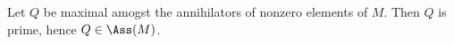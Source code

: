 Let $Q$ be maximal amogst the annihilators of nonzero elements of $M$.
Then $Q$ is prime, hence $Q \in \Ass(M)$.
